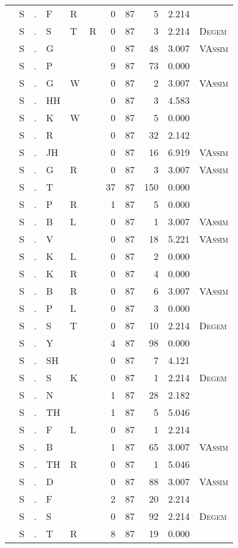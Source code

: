 \begin{longtable}{r@{ } r@{ } c@{ } l@{ } l@{ } l@{ } r r r r l }
 & S & . & F & R &  & 0 & 87 & 5 & 2.214 &  \\
 & S & . & S & T & R & 0 & 87 & 3 & 2.214 & \textsc{Degem} \\
 & S & . & G &  &  & 0 & 87 & 48 & 3.007 & \textsc{VAssim} \\
 & S & . & P &  &  & 9 & 87 & 73 & 0.000 &  \\
 & S & . & G & W &  & 0 & 87 & 2 & 3.007 & \textsc{VAssim} \\
 & S & . & HH &  &  & 0 & 87 & 3 & 4.583 &  \\
 & S & . & K & W &  & 0 & 87 & 5 & 0.000 &  \\
 & S & . & R &  &  & 0 & 87 & 32 & 2.142 &  \\
 & S & . & JH &  &  & 0 & 87 & 16 & 6.919 & \textsc{VAssim} \\
 & S & . & G & R &  & 0 & 87 & 3 & 3.007 & \textsc{VAssim} \\
 & S & . & T &  &  & 37 & 87 & 150 & 0.000 &  \\
 & S & . & P & R &  & 1 & 87 & 5 & 0.000 &  \\
 & S & . & B & L &  & 0 & 87 & 1 & 3.007 & \textsc{VAssim} \\
 & S & . & V &  &  & 0 & 87 & 18 & 5.221 & \textsc{VAssim} \\
 & S & . & K & L &  & 0 & 87 & 2 & 0.000 &  \\
 & S & . & K & R &  & 0 & 87 & 4 & 0.000 &  \\
 & S & . & B & R &  & 0 & 87 & 6 & 3.007 & \textsc{VAssim} \\
 & S & . & P & L &  & 0 & 87 & 3 & 0.000 &  \\
 & S & . & S & T &  & 0 & 87 & 10 & 2.214 & \textsc{Degem} \\
 & S & . & Y &  &  & 4 & 87 & 98 & 0.000 &  \\
 & S & . & SH &  &  & 0 & 87 & 7 & 4.121 &  \\
 & S & . & S & K &  & 0 & 87 & 1 & 2.214 & \textsc{Degem} \\
 & S & . & N &  &  & 1 & 87 & 28 & 2.182 &  \\
 & S & . & TH &  &  & 1 & 87 & 5 & 5.046 &  \\
 & S & . & F & L &  & 0 & 87 & 1 & 2.214 &  \\
 & S & . & B &  &  & 1 & 87 & 65 & 3.007 & \textsc{VAssim} \\
 & S & . & TH & R &  & 0 & 87 & 1 & 5.046 &  \\
 & S & . & D &  &  & 0 & 87 & 88 & 3.007 & \textsc{VAssim} \\
 & S & . & F &  &  & 2 & 87 & 20 & 2.214 &  \\
 & S & . & S &  &  & 0 & 87 & 92 & 2.214 & \textsc{Degem} \\
 & S & . & T & R &  & 8 & 87 & 19 & 0.000 &  \\
\bottomrule
\end{longtable}
